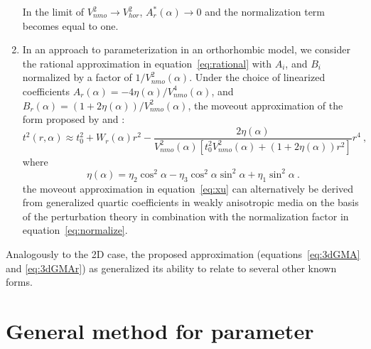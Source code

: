 \begin{enumerate}
{In the limit of $V^2_{nmo} \rightarrow V^2_{hor}$, $A^*_r(\alpha)\rightarrow0$ and the normalization term becomes equal to one.
}
\item In an  approach to parameterization in an orthorhombic model, we consider the rational approximation in equation~\ref{eq:rational} with $A_i$, and $B_i$ normalized by a factor of $1/V^2_{nmo}(\alpha)$. Under the choice of linearized coefficients $A_r(\alpha) = -4 \eta(\alpha)/V^4_{nmo}(\alpha)$, and $B_r(\alpha) = (1+2\eta(\alpha))/V^2_{nmo}(\alpha)$,  the moveout approximation of the form proposed by \cite{xu} and \cite{vascon}:
\begin{equation}
\label{eq:xu}
    t^2(r,\alpha) \approx t^2_0 + W_r(\alpha)r^2-\frac{2\eta(\alpha)}{V^2_{nmo}(\alpha) \left[t^2_0V^2_{nmo}(\alpha) + \left(1+2\eta(\alpha)\right)r^2\right]}r^4~,
\end{equation} 
where
\begin{equation}
\label{eq:etaazi}
\eta(\alpha)=  \eta_2\cos^2 \alpha - \eta_3\cos^2 \alpha \sin^2 \alpha + \eta_1\sin^2 \alpha~.
\end{equation}
 the moveout approximation in equation~\ref{eq:xu} can alternatively be derived from generalized quartic coefficients in weakly anisotropic media on the basis of the perturbation theory in combination with the normalization factor in equation~\ref{eq:normalize}. 

\end{enumerate}

Analogously to the 2D case,  the proposed approximation (equations~\ref{eq:3dGMA} and \ref{eq:3dGMAr}) as generalized  its ability to relate to several other known forms.

\section{General method for parameter }

